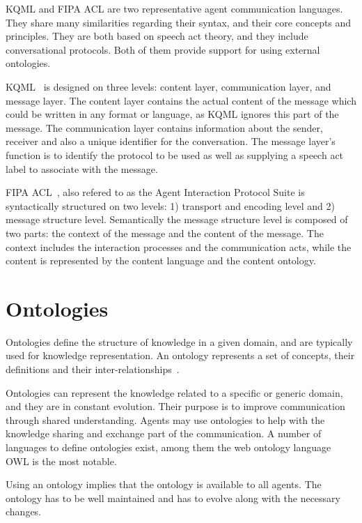 \documentclass[a4paper,12pt,oneside,fleqn]{book} %
\begin{document}
KQML and FIPA ACL are two representative agent communication
languages. They share many similarities regarding their syntax, and their
core concepts and principles. They are both based on speech act theory, and
they include conversational protocols. Both of them provide support for
using external ontologies.

KQML~\cite{DBLP:conf/cikm/FininFMM94} is designed on three levels: content
layer, communication layer, and message layer. The content layer contains
the actual content of the message which could be written in any format or
language, as KQML ignores this part of the message. The communication layer
contains information about the sender, receiver and also a unique
identifier for the conversation. The message layer's function is to
identify the protocol to be used as well as supplying a speech act label to
associate with the message.

FIPA ACL~\cite{DBLP:journals/taas/Poslad07}, also refered to as the Agent
Interaction Protocol Suite is syntactically structured on two levels: 1)
transport and encoding level and 2) message structure level. Semantically
the message structure level is composed of two parts: the context of the
message and the content of the message. The context includes the
interaction processes and the communication acts, while the content is
represented by the content language and the content ontology.

\section{Ontologies} %

Ontologies define the structure of knowledge in a given domain, and are
typically used for knowledge representation. An ontology represents a set
of concepts, their definitions and their inter-relationships~\cite{DBLP:journals/ker/UscholdG96}. 

Ontologies can represent the knowledge related to a specific or generic
domain, and they are in constant evolution. Their purpose is to improve
communication through shared understanding. Agents may use ontologies to
help with the knowledge sharing and exchange part of the communication. A
number of languages to define ontologies exist, among them the web ontology
language OWL is the most notable.

Using an ontology implies that the ontology is available to all agents. The
ontology has to be well maintained and has to evolve along with the
necessary changes.
\end{document}
